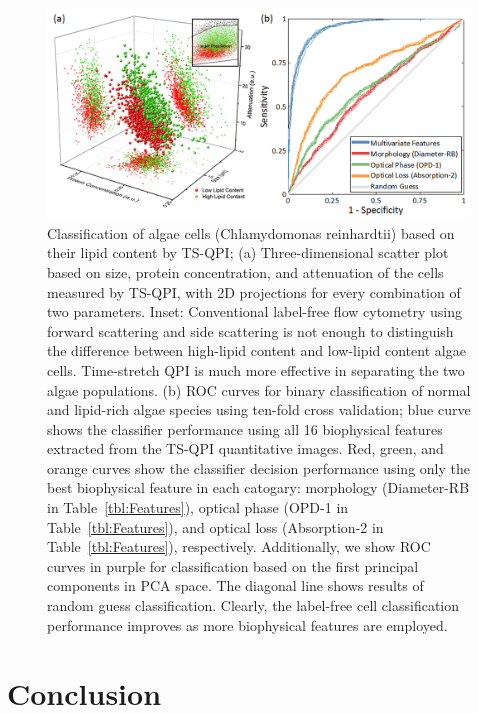 \documentclass[aps,pra,reprint,superscriptaddress]{revtex4-1}
\begin{document}
\begin{figure}
\includegraphics[scale=0.5]{FigureAlgae.jpg}
\caption{\label{fig:AlgaeScatter} Classification of algae cells (Chlamydomonas reinhardtii) based on their lipid content by TS-QPI; (a) Three-dimensional scatter plot based on size, protein concentration, and attenuation of the cells measured by TS-QPI, with 2D projections for every combination of two parameters. Inset: Conventional label-free flow cytometry using forward scattering and side scattering is not enough to distinguish the difference between high-lipid content and low-lipid content algae cells. Time-stretch QPI is much more effective in separating the two algae populations. (b) ROC curves for binary classification of normal and lipid-rich algae species using ten-fold cross validation; blue curve shows the classifier performance using all 16 biophysical features extracted from the TS-QPI quantitative images. Red, green, and orange curves show the classifier decision performance using only the best biophysical feature in each catogary: morphology (Diameter-RB in Table~\ref{tbl:Features}), optical phase (OPD-1 in Table~\ref{tbl:Features}), and optical loss (Absorption-2 in Table~\ref{tbl:Features}), respectively. Additionally, we show ROC curves in purple for classification based on the first principal components in PCA space. The diagonal line shows results of random guess classification. Clearly, the label-free cell classification performance improves as more biophysical features are employed.}
\end{figure}

\section{Conclusion}
\end{document}

